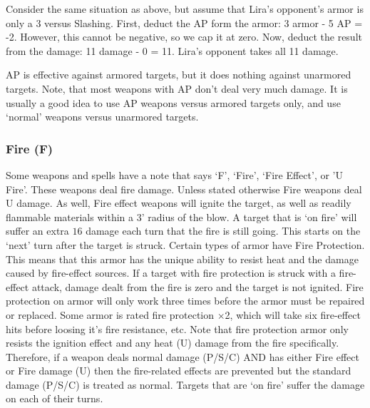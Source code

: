 \documentclass[twoside]{book}
\begin{document}
  
    {  
     Consider the same situation as above, but assume
                 that Lira's opponent's armor is only a 3
                 versus Slashing. First, deduct the AP form the armor: 3
                 armor - 5 AP = -2. However, this cannot be negative, so
                 we cap it at zero. Now, deduct the result from the
                 damage: 11 damage - 0 = 11. Lira's opponent takes
                 all 11 damage. 
    }
  
    {  
    AP is effective against armored targets, but it
                 does nothing against unarmored targets. Note, that most
                 weapons with AP don't deal very much damage. It is
                 usually a good idea to use AP weapons versus armored
                 targets only, and use `normal' weapons
                 versus unarmored targets. 
    }
  
    

\subsubsection{Fire (F)}
    
    {  
    Some weapons and spells have a note that says
                 `F', `Fire', `Fire
                 Effect', or 'U Fire'. These weapons
                 deal fire damage. Unless stated otherwise Fire weapons
                 deal U damage. As well, Fire effect weapons will ignite
                 the target, as well as readily flammable materials
                 within a 3' radius of the blow. A target that is
                 `on fire' will suffer an extra \ensuremath{1}\ensuremath{6}\ensuremath{} damage
                 each turn that the fire is still going. This starts on
                 the `next' turn after the target is struck.
                 Certain types of armor have Fire Protection. This means
                 that this armor has the unique ability to resist heat
                 and the damage caused by fire-effect sources. If a
                 target with fire protection is struck with a fire-effect
                 attack, damage dealt from the fire is zero and the
                 target is not ignited. Fire protection on armor will
                 only work three times before the armor must be repaired
                 or replaced. Some armor is rated fire protection
                 \begin{math}\times \end{math}2, which will take six
                 fire-effect hits before loosing it's fire
                 resistance, etc. Note that fire protection armor only
                 resists the ignition effect and any heat (U) damage
                 from the fire specifically.  Therefore, if a weapon
                 deals normal damage (P/S/C) AND has either Fire
                 effect or Fire damage (U) then the fire-related
                 effects are prevented but the standard damage (P/S/C)
                 is treated as normal. Targets that are `on
                 fire' suffer the damage on each of their
                 turns. 
    }
  
\end{document}
